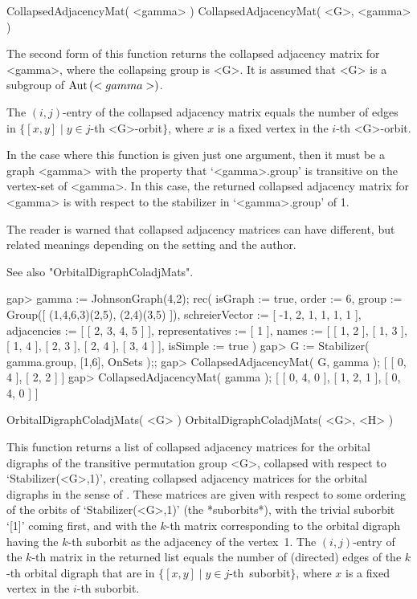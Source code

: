 
\>CollapsedAdjacencyMat( <gamma> )
\>CollapsedAdjacencyMat( <G>, <gamma> )

The second form of this function returns  the  collapsed adjacency
matrix for <gamma>, where the  collapsing group  is <G>.  It is
assumed that <G> is a subgroup of ${\rm Aut}\,(<gamma>)$.

The $(i,j)$-entry of the collapsed adjacency matrix  equals the number of
edges in   $\{ [x,y]\mid  y \in j$-th <G>-orbit$\}$, where  $x$ is  a fixed
vertex in the $i$-th <G>-orbit.

In the case where this function is given just one argument, then it must
be a graph <gamma> with the property that `<gamma>.group' is transitive on
the vertex-set of <gamma>.  In this case, the returned collapsed adjacency
matrix for <gamma> is with respect to the stabilizer in `<gamma>.group'
of 1.

The reader is warned that collapsed adjacency matrices can have different,
but related meanings depending on the setting and the author.

See also "OrbitalDigraphColadjMats".

\beginexample
gap> gamma := JohnsonGraph(4,2);
rec( isGraph := true, order := 6,
  group := Group([ (1,4,6,3)(2,5), (2,4)(3,5) ]),
  schreierVector := [ -1, 2, 1, 1, 1, 1 ], adjacencies := [ [ 2, 3, 4, 5 ] ],
  representatives := [ 1 ],
  names := [ [ 1, 2 ], [ 1, 3 ], [ 1, 4 ], [ 2, 3 ], [ 2, 4 ], [ 3, 4 ] ],
  isSimple := true )
gap> G := Stabilizer( gamma.group, [1,6], OnSets );;
gap> CollapsedAdjacencyMat( G, gamma );
[ [ 0, 4 ], [ 2, 2 ] ]
gap> CollapsedAdjacencyMat( gamma );
[ [ 0, 4, 0 ], [ 1, 2, 1 ], [ 0, 4, 0 ] ]
\endexample


\>OrbitalDigraphColadjMats( <G> )
\>OrbitalDigraphColadjMats( <G>, <H> )

This function returns a list of collapsed adjacency matrices for the
orbital digraphs of the transitive permutation group <G>, collapsed with
respect to `Stabilizer(<G>,1)', creating collapsed adjacency matrices
for the orbital digraphs in the sense of \cite{PS97}.  These matrices are
given with respect to some ordering of the orbits of `Stabilizer(<G>,1)'
(the *suborbits*), with the trivial suborbit `[1]' coming first, and
with the $k$-th matrix corresponding to the orbital digraph having the
$k$-th suborbit as the adjacency of the vertex~1. The $(i,j)$-entry of the
$k$-th matrix in the returned list equals the number of (directed) edges
of the $k$-th orbital digraph that are in 
$\{ [x,y]\mid y \in j$-th~suborbit$\}$, 
where $x$ is a fixed vertex in the $i$-th suborbit.

